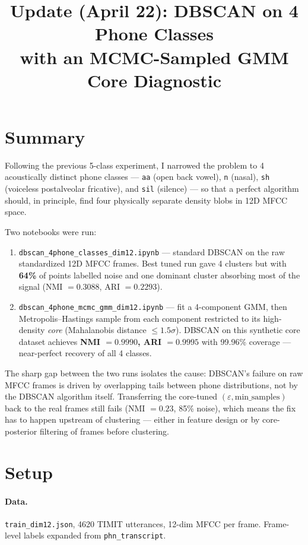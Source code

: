 \documentclass[11pt]{article}
\title{Update (April 22): DBSCAN on 4 Phone Classes \\ with an MCMC-Sampled GMM Core Diagnostic}
\author{}
\date{}
\begin{document}
\maketitle
\thispagestyle{empty}

\section*{Summary}

Following the previous 5-class experiment, I narrowed the problem to 4 acoustically distinct phone classes --- \texttt{aa} (open back vowel), \texttt{n} (nasal), \texttt{sh} (voiceless postalveolar fricative), and \texttt{sil} (silence) --- so that a perfect algorithm should, in principle, find four physically separate density blobs in 12D MFCC space.

Two notebooks were run:
\begin{enumerate}
\item \texttt{dbscan\_4phone\_classes\_dim12.ipynb} --- standard DBSCAN on the raw standardized 12D MFCC frames. Best tuned run gave 4 clusters but with \textbf{64\%} of points labelled noise and one dominant cluster absorbing most of the signal (NMI $= 0.3088$, ARI $= 0.2293$).
\item \texttt{dbscan\_4phone\_mcmc\_gmm\_dim12.ipynb} --- fit a 4-component GMM, then Metropolis--Hastings sample from each component restricted to its high-density \emph{core} (Mahalanobis distance $\leq 1.5\sigma$). DBSCAN on this synthetic core dataset achieves \textbf{NMI $= 0.9990$, ARI $= 0.9995$} with 99.96\% coverage --- near-perfect recovery of all 4 classes.
\end{enumerate}

The sharp gap between the two runs isolates the cause: DBSCAN's failure on raw MFCC frames is driven by overlapping tails between phone distributions, not by the DBSCAN algorithm itself. Transferring the core-tuned $(\varepsilon, \text{min\_samples})$ back to the real frames still fails (NMI $= 0.23$, 85\% noise), which means the fix has to happen upstream of clustering --- either in feature design or by core-posterior filtering of frames before clustering.

\section*{Setup}

\paragraph{Data.} \texttt{train\_dim12.json}, 4620 TIMIT utterances, 12-dim MFCC per frame. Frame-level labels expanded from \texttt{phn\_transcript}.
\end{document}
